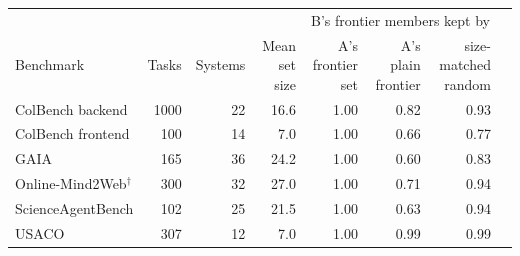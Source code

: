 \begin{tabular}{lrrrrrrr}
\toprule
 & & & & \multicolumn{3}{c}{B's frontier members kept by} & \\
Benchmark & Tasks & Systems & Mean set size & A's frontier set & A's plain frontier & size-matched random & \\
\midrule
ColBench backend & 1000 & 22 & 16.6 & 1.00 & 0.82 & 0.93 & \\
ColBench frontend & 100 & 14 & 7.0 & 1.00 & 0.66 & 0.77 & \\
GAIA & 165 & 36 & 24.2 & 1.00 & 0.60 & 0.83 & \\
Online-Mind2Web$^{\dagger}$ & 300 & 32 & 27.0 & 1.00 & 0.71 & 0.94 & \\
ScienceAgentBench & 102 & 25 & 21.5 & 1.00 & 0.63 & 0.94 & \\
USACO & 307 & 12 & 7.0 & 1.00 & 0.99 & 0.99 & \\
\bottomrule
\end{tabular}
